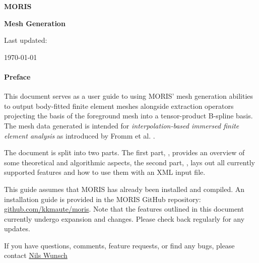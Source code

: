 
\newpage
\thispagestyle{empty}

\vspace{3.0cm}

\bigskip
\centerline{ \Large{ \textbf{ MORIS }}} 
\vspace{0.3cm}
\centerline{ \Large{ \textbf{ Mesh Generation }}}


\vspace{1.0cm}

\begin{center}
	\centerline{Last updated:} 
    \today
\end{center}



\vspace{1.6cm}

\paragraph{Preface}
This document serves as a user guide to using MORIS' mesh generation abilities to output body-fitted finite element meshes alongside extraction operators projecting the basis of the foreground mesh into a tensor-product B-spline basis. The mesh data generated is intended for \emph{interpolation-based immersed finite element analysis} as introduced by Fromm et al. \cite{Fromm2022}. 

The document is split into two parts. The first part, ,  provides an overview of some theoretical and algorithmic aspects, the second part, , lays out all currently supported features and how to use them with an \textsc{XML} input file. 

This guide assumes that MORIS has already been installed and compiled. An installation guide is provided in the MORIS GitHub repository:
\href{https://github.com/kkmaute/moris/tree/main/share/install}{github.com/kkmaute/moris}.
Note that the features outlined in this document currently undergo expansion and changes. Please check back regularly for any updates.

If you have questions, comments, feature requests, or find any bugs, please contact \href{mailto:nils.wunsch@colorado.com}{Nils Wunsch \Letter}


